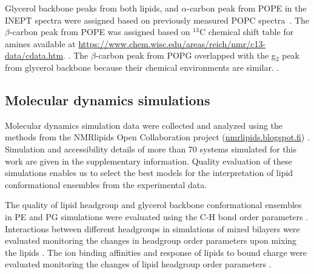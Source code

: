 \documentclass[aps,prl,superscriptaddress,twocolumn]{revtex4}
\begin{document}
Glycerol backbone peaks from both lipids, and $\alpha$-carbon peak from POPE in the INEPT spectra 
were assigned based on previously measured POPC spectra~\cite{ferreira13}.
The $\beta$-carbon peak from POPE was assigned based on $^{13}$C chemical shift table for amines available
at \url{https://www.chem.wisc.edu/areas/reich/nmr/c13-data/cdata.htm}.
.
The $\beta$-carbon peak from POPG overlapped with the g$_2$ peak from glycerol backbone
because their chemical environments are similar.
.

\subsection{Molecular dynamics simulations}

Molecular dynamics simulation data were collected and analyzed using
the methods from the NMRlipids Open Collaboration project (\url{nmrlipids.blogspot.fi}) \cite{botan15,catte16,ollila16,antila19}.
Simulation and accessibility details of more than 70 systems simulated for this work are given in the supplementary information. Quality evaluation of these simulations enables us to select the best models for the interpretation of lipid conformational ensembles from the experimental data.

The quality of lipid headgroup and glycerol backbone conformational ensembles in PE and PG simulations were evaluated using the C-H bond order parameters \cite{botan15}. Interactions between different headgroups in simulations of mixed bilayers were evaluated monitoring the changes in headgroup order parameters upon mixing the lipids \cite{antila19}. The ion binding affinities and response of lipids to bound charge were evaluated monitoring the changes of lipid headgroup order parameters \cite{catte16,antila19}.
\end{document}
